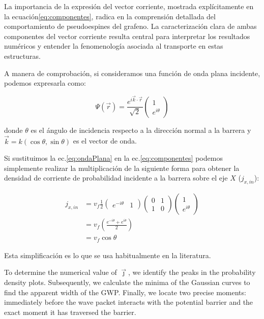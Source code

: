 La importancia de la expresión del vector corriente, mostrada explícitamente en la ecuación\eqref{eq:componentes}, radica en la comprensión detallada del comportamiento de pseudoespines del grafeno.
La caracterización clara de ambas componentes del vector corriente resulta central para interpretar los resultados numéricos y entender la fenomenología asociada al transporte en estas estructuras.

A manera de comprobación, si consideramos una función de onda plana incidente, podemos expresarla como:

\begin{equation}
    \label{eq:ondaPlana}
    \Psi(\vec{r})=\frac{e^{i\vec{k}\cdot\vec{r}}}{\sqrt{2}}
    \begin{pmatrix}
        1 \\ e^{i\theta}
    \end{pmatrix}
\end{equation}

\noindent donde $\theta$ es el ángulo de incidencia respecto a la dirección normal a la barrera y $\vec{k} = k(\cos\theta,\sin\theta)$ es el vector de onda.

Si sustituimos la ec.\eqref{eq:ondaPlana} en la ec.\eqref{eq:componentes} podemos simplemente realizar la multiplicación de la siguiente forma para obtener la densidad de corriente de probabilidad incidente a la barrera sobre el eje $X$ ($j_{x,in}$):

\begin{align}
    \label{eq:jdemostrada}
    j_{x, in}&=v_f\frac{1}{2}
    \begin{pmatrix}
        e^{-i\theta} & 1
    \end{pmatrix}
    \begin{pmatrix}
        0 & 1 \\
        1 & 0
    \end{pmatrix}
    \begin{pmatrix}
        1 \\ e^{i\theta}
    \end{pmatrix}\nonumber \\
    &=v_f\left( \frac{e^{-i\theta} + e^{i\theta}}{2} \right)\nonumber \\
    &=v_f\cos\theta
\end{align}

Esta simplificación es lo que se usa habitualmente en la literatura\cite{DahalJPhysChemSolids2017, WuJAP2009}.

To determine the numerical value of $\vec{\jmath}$, we identify the peaks in the probability density plots.
Subsequently, we calculate the minima of the Gaussian curves to find the apparent width of the GWP. Finally, we locate two precise moments: immediately before the wave packet interacts with the potential barrier and the exact moment it has traversed the barrier.

